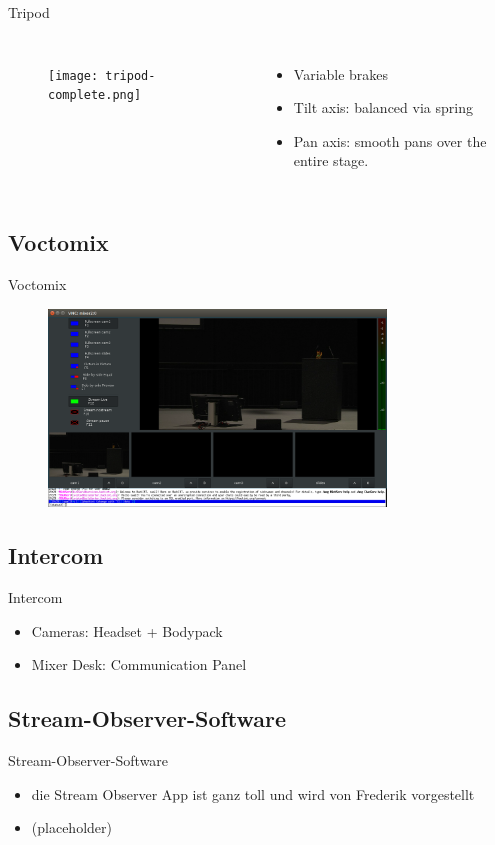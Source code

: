 \documentclass[hyperref={pdfpagelabels=false},aspectratio=169]{beamer}
\begin{document}
\begin{frame}{Tripod}
	\begin{columns}[T,onlytextwidth]
	\begin{figure} 
		\centering
		\texttt{[image: tripod-complete.png]}
	\end{figure}
	\begin{itemize}
	\item Variable brakes
 	\item Tilt axis: balanced via spring
 	\item Pan axis: smooth pans over the entire stage.
		\end{itemize}
	\end{columns}
\end{frame}

\subsection{Voctomix} %
\begin{frame}{Voctomix}
	\begin{figure} 
		\centering
		\includegraphics[width=0.8\textwidth]{voctomix.png}
	\end{figure}
\end{frame}

\subsection{Intercom} %
 	\begin{frame}{Intercom}
 	\begin{itemize}
 		\item Cameras: Headset + Bodypack
 		\item Mixer Desk: Communication Panel
 	\end{itemize}
 	\end{frame}

\subsection{Stream-Observer-Software} %
\begin{frame}{Stream-Observer-Software}
\begin{itemize}
\item die Stream Observer App  ist ganz toll und wird von Frederik vorgestellt
\item  (placeholder)
\end{itemize}
\end{frame}
\end{document}
